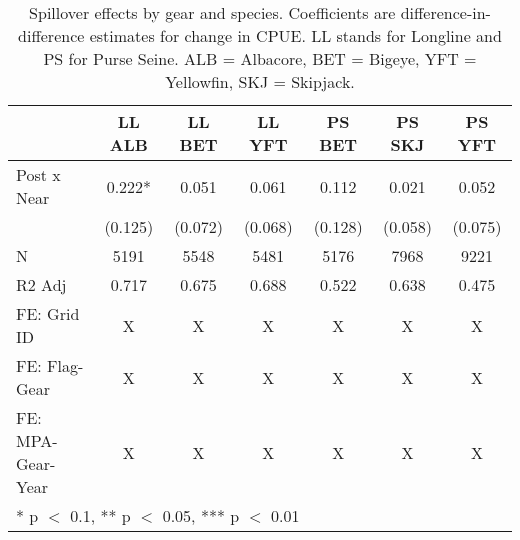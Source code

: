 \begin{table}

\caption{\label{tab:spp_reg}Spillover effects by gear and species. Coefficients are
             difference-in-difference estimates for change in CPUE. LL stands for Longline and PS for Purse Seine. ALB = Albacore, BET = Bigeye, YFT = Yellowfin, SKJ = Skipjack.}
\centering
\begin{tabular}[t]{lcccccc}
\toprule
  & LL ALB & LL BET & LL YFT & PS BET & PS SKJ & PS YFT\\
\midrule
Post x Near & \num{0.222}* & \num{0.051} & \num{0.061} & \num{0.112} & \num{0.021} & \num{0.052}\\
 & (\num{0.125}) & (\num{0.072}) & (\num{0.068}) & (\num{0.128}) & (\num{0.058}) & (\num{0.075})\\
\midrule
N & \num{5191} & \num{5548} & \num{5481} & \num{5176} & \num{7968} & \num{9221}\\
R2 Adj & \num{0.717} & \num{0.675} & \num{0.688} & \num{0.522} & \num{0.638} & \num{0.475}\\
FE: Grid ID & X & X & X & X & X & X\\
FE: Flag-Gear & X & X & X & X & X & X\\
FE: MPA-Gear-Year & X & X & X & X & X & X\\
\bottomrule
\multicolumn{7}{l}{\rule{0pt}{1em}* p $<$ 0.1, ** p $<$ 0.05, *** p $<$ 0.01}\\
\end{tabular}
\end{table}
